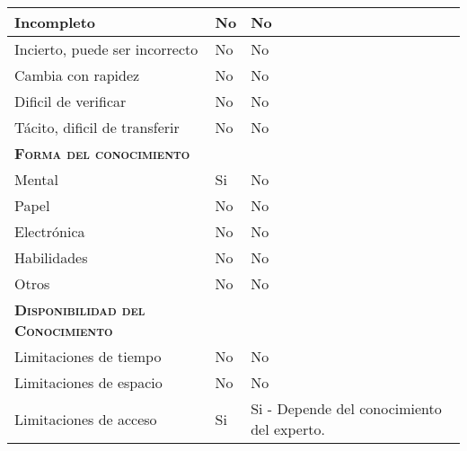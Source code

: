 \begin{table}[H]
{\begin{tabular}{|l|l|l|}
		Incompleto & \multicolumn{1}{p{1.0cm}|}{No} & \multicolumn{1}{p{13.0cm}|}{No}\\
		\hline

		Incierto, puede ser incorrecto & \multicolumn{1}{p{1.0cm}|}{No} & \multicolumn{1}{p{13.0cm}|}{No}\\
		\hline

		Cambia con rapidez & \multicolumn{1}{p{1.0cm}|}{No} & \multicolumn{1}{p{13.0cm}|}{No}\\
		\hline

		Dificil de verificar & \multicolumn{1}{p{1.0cm}|}{No} & \multicolumn{1}{p{13.0cm}|}{No}\\
		\hline

		Tácito, dificil de transferir& \multicolumn{1}{p{1.0cm}|}{No} & \multicolumn{1}{p{13.0cm}|}{No}\\
		\hline

		\textsc {\textbf{Forma del conocimiento}}& \multicolumn{1}{p{1.0cm}|}{} & \multicolumn{1}{p{13.0cm}|}{}\\
		\hline

		Mental & \multicolumn{1}{p{1.0cm}|}{Si} & \multicolumn{1}{p{13.0cm}|}{No}\\
		\hline

		Papel & \multicolumn{1}{p{1.0cm}|}{No} & \multicolumn{1}{p{13.0cm}|}{No}\\
		\hline

		Electrónica & \multicolumn{1}{p{1.0cm}|}{No} & \multicolumn{1}{p{13.0cm}|}{No}\\
		\hline

		Habilidades & \multicolumn{1}{p{1.0cm}|}{No} & \multicolumn{1}{p{13.0cm}|}{No}\\
		\hline

		Otros & \multicolumn{1}{p{1.0cm}|}{No} & \multicolumn{1}{p{13.0cm}|}{No}\\
		\hline

		\textsc {\textbf{Disponibilidad del Conocimiento}} & \multicolumn{1}{p{1.0cm}|}{} & \multicolumn{1}{p{13.0cm}|}{}\\
		\hline
		Limitaciones de tiempo& \multicolumn{1}{p{1.0cm}|}{No} & \multicolumn{1}{p{13.0cm}|}{No}\\
		\hline

		Limitaciones de espacio& \multicolumn{1}{p{1.0cm}|}{No} & \multicolumn{1}{p{13.0cm}|}{No}\\
		\hline

		Limitaciones de acceso& \multicolumn{1}{p{1.0cm}|}{Si} & \multicolumn{1}{p{13.0cm}|}{Si - Depende del conocimiento del experto.}\\
		\hline


\end{tabular}}
\end{table}
